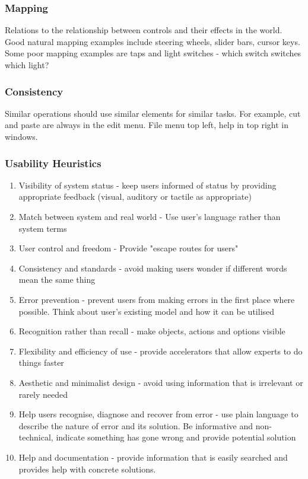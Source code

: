 \documentclass[a4paper]{article}
\theoremstyle{plain}
\theoremstyle{definition}
\theoremstyle{remark}
\begin{document}
\begin{flushleft}
\subsubsection{Mapping}
Relations to the relationship between controls and their effects in the world. Good natural mapping examples include steering wheels, slider bars, cursor keys. Some poor mapping examples are taps and light switches - which switch switches which light?
\subsubsection{Consistency}
Similar operations should use similar elements for similar tasks. For example, cut and paste are always in the edit menu. File menu top left, help in top right in windows.
\subsubsection{Usability Heuristics}
\begin{enumerate}
	\item Visibility of system status - keep users informed of status by providing appropriate feedback (visual, auditory or tactile as appropriate)
	\item Match between system and real world - Use user's language rather than system terms
	\item User control and freedom - Provide "escape routes for users"
	\item Consistency and standards - avoid making users wonder if different words mean the same thing
	\item Error prevention - prevent users from making errors in the first place where possible. Think about user's existing model and how it can be utilised
	\item Recognition rather than recall - make objects, actions and options visible
	\item Flexibility and efficiency of use - provide accelerators that allow experts to do things faster
	\item Aesthetic and minimalist design - avoid using information that is irrelevant or rarely needed
	\item Help users recognise, diagnose and recover from error - use plain language to describe the nature of error and its solution. Be informative and non-technical, indicate something has gone wrong and provide potential solution
	\item Help and documentation - provide information that is easily searched and provides help with concrete solutions.
\end{enumerate}

\end{flushleft}
\end{document}
